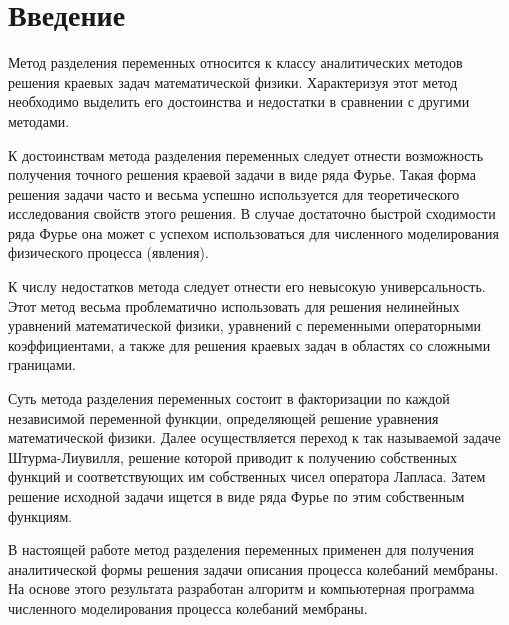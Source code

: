 \section*{Введение}
{
Метод разделения переменных относится к классу аналитических
методов решения краевых задач математической физики. Характеризуя этот
метод необходимо выделить его достоинства и недостатки в сравнении с
другими методами.

К достоинствам метода разделения переменных следует отнести
возможность получения точного решения краевой задачи в виде ряда Фурье.
Такая форма решения задачи часто и весьма успешно используется для
теоретического исследования свойств этого решения. В случае достаточно
быстрой сходимости ряда Фурье она может с успехом использоваться для
численного моделирования физического процесса (явления).

К числу недостатков метода следует отнести его невысокую
универсальность. Этот метод весьма проблематично использовать для
решения нелинейных уравнений математической физики, уравнений с
переменными операторными коэффициентами, а также для решения краевых
задач в областях со сложными границами.

Суть метода разделения переменных состоит в факторизации по
каждой независимой переменной функции, определяющей решение
уравнения математической физики. Далее осуществляется переход к так
называемой задаче Штурма-Лиувилля, решение которой приводит к
получению собственных функций и соответствующих им собственных чисел
оператора Лапласа. Затем решение исходной задачи ищется в виде ряда
Фурье по этим собственным функциям.
    
В настоящей работе метод разделения переменных применен для
получения аналитической формы решения задачи описания процесса колебаний мембраны.
На основе этого результата разработан алгоритм и компьютерная программа
численного моделирования процесса колебаний мембраны.    
}
\newpage

\titleformat{\section}{\large\bfseries}{\thesection}{0.5em}{}
\titlespacing*{\section}{\parindent}{1ex}{1em}
